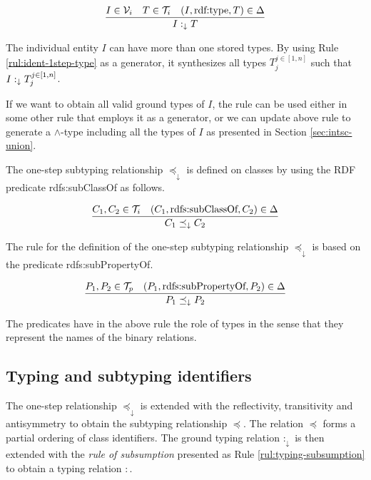 \documentclass[runningheads]{llncs}
\newcommand{\darr}{\downarrow}
\newcommand{\V}{{\cal V}}
\newcommand{\T}{{\cal T}}
\begin{document}
\begin{equation}
\label{rul:ident-1step-type}
\dfrac{I\in\V_i\quad T\in\T_i\quad (I,\text{rdf:type},T)\in\D}
      {I :_\darr T}
\end{equation}

The individual entity $I$ can have more than one stored types. By
using Rule \ref{rul:ident-1step-type} as a generator, it synthesizes
all types $T_j^{j\in[1,n]}$ such that $I:_\darr\/T_j^{j\in[1,n]}$.

If we want to obtain all valid ground types of $I$, the rule can be
used either in some other rule that employs it as a generator, or we
can update above rule to generate a $\land$-type including all the
types of $I$ as presented in Section \ref{sec:intsc-union}.

The one-step subtyping relationship $\preceq_\darr$ is defined on
classes by using the RDF predicate rdfs:sub\-ClassOf as follows.

\begin{equation}
\label{rul:ident-1step-subtype}
\dfrac{C_1,C_2\in\T_i \quad (C_1,\text{rdfs:subClassOf},C_2)\in\D}
{C_1 \preceq_\darr\/C_2}
\end{equation}

The rule for the definition of the one-step subtyping relationship
$\preceq_\darr$ is based on the predicate rdfs:subPropertyOf.

\begin{equation}
\dfrac{P_1,P_2\in\T_p \quad (P_1,\text{rdfs:subPropertyOf},P_2)\in\D}
      {P_1\preceq_\darr\/P_2}
\end{equation}

The predicates have in the above rule the role of types in the sense
that they represent the names of the binary relations. 



\subsection{Typing and subtyping identifiers\label{sec:idents-typing}}

The one-step relationship $\preceq_\darr$ is extended with the
reflectivity, transitivity and antisymmetry to obtain the subtyping
relationship $\preceq$. The relation $\preceq$ forms a partial ordering of
class identifiers. The ground typing relation $:_\darr$ is then
extended with the \emph{rule of subsumption} presented as Rule
\ref{rul:typing-subsumption} to obtain a typing relation $:$.
\end{document}
